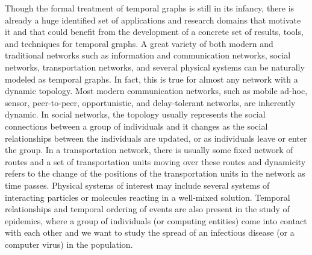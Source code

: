 \documentclass[oribibl, 11pt]{llncs}
\begin{document}
Though the formal treatment of temporal graphs is still in its infancy, there is already a huge identified set of applications and research domains that motivate it and that could benefit from the development of a concrete set of results, tools, and techniques for temporal graphs. A great variety of both modern and traditional networks such as information and communication networks, social networks, transportation networks, and several physical systems can be naturally modeled as temporal graphs. In fact, this is true for almost any network with a dynamic topology. Most modern communication networks, such as mobile ad-hoc, sensor, peer-to-peer, opportunistic, and delay-tolerant networks, are inherently dynamic. In social networks, the topology usually represents the social connections between a group of individuals and it changes as the social relationships between the individuals are updated, or as individuals leave or enter the group. In a transportation network, there is usually some fixed network of routes and a set of transportation units moving over these routes and dynamicity refers to the change of the positions of the transportation units in the network as time passes. Physical systems of interest may include several systems of interacting particles or molecules reacting in a well-mixed solution. Temporal relationships and temporal ordering of events are also present in the study of epidemics, where a group of individuals (or computing entities) come into contact with each other and we want to study the spread of an infectious disease (or a computer virus) in the population.
\end{document}
